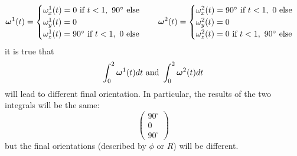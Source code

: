 \documentclass[10pt, letterpaper]{report}
\begin{document}
\begin{equation}
    {\boldsymbol{\omega}}^1(t)=\begin{cases}
        \omega^1_x(t)= 0 \text{ if }t<1, \ 90^\circ\text{ else}\\ 
        \omega^1_y(t)= 0 \\ 
        \omega^1_z(t)= 90^\circ \text{ if }t<1, \ 0\text{ else}
    \end{cases} \ \ \  
     {\boldsymbol{\omega}}^2(t)=\begin{cases}
        \omega^2_x(t)= 90^\circ \text{ if }t<1, \ 0\text{ else}\\ 
        \omega^2_y(t)= 0 \\ 
        \omega^2_z(t)= 0 \text{ if }t<1, \ 90^\circ\text{ else}
    \end{cases}
\end{equation}
it is true that \begin{equation}
    \int_0^2{\boldsymbol{\omega}}^1(t)dt\text{ and }\int_0^2{\boldsymbol{\omega}}^2(t)dt
\end{equation}
will lead to different final orientation. In particular, the results of the two integrals will be the same:\begin{equation}
    \begin{pmatrix}
        90^\circ\\ 0 \\ 90^\circ
    \end{pmatrix}
\end{equation}
but the final orientations (described by $\phi$ or $R$) will be different.
\end{document}
